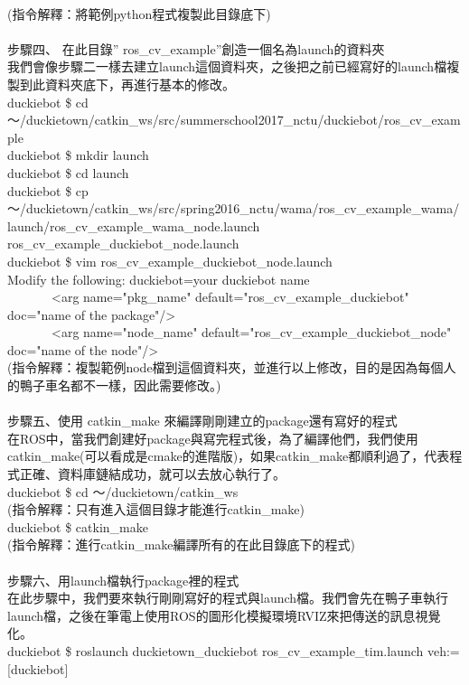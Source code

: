 \documentclass{article}
\begin{document}
\\(指令解釋：將範例python程式複製此目錄底下)
\\\\步驟四、 在此目錄” ros\_cv\_example”創造一個名為launch的資料夾
\\我們會像步驟二一樣去建立launch這個資料夾，之後把之前已經寫好的launch檔複製到此資料夾底下，再進行基本的修改。
\\duckiebot \$ cd ～/duckietown/catkin\_ws/src/summerschool2017\_nctu/duckiebot/ros\_cv\_example
\\duckiebot \$ mkdir launch
\\duckiebot \$ cd launch
\\duckiebot \$ cp ～/duckietown/catkin\_ws/src/spring2016\_nctu/wama/ros\_cv\_example\_wama/launch/ros\_cv\_example\_wama\_node.launch ros\_cv\_example\_duckiebot\_node.launch
\\duckiebot \$ vim ros\_cv\_example\_duckiebot\_node.launch
\\Modify the following: duckiebot=your duckiebot name
\\       <arg name="pkg\_name" default="ros\_cv\_example\_duckiebot" doc="name of the package"/>
\\       <arg name="node\_name" default="ros\_cv\_example\_duckiebot\_node" doc="name of the node"/>
\\(指令解釋：複製範例node檔到這個資料夾，並進行以上修改，目的是因為每個人的鴨子車名都不一樣，因此需要修改。)
\\\\步驟五、使用 catkin\_make 來編譯剛剛建立的package還有寫好的程式
\\在ROS中，當我們創建好package與寫完程式後，為了編譯他們，我們使用catkin\_make(可以看成是cmake的進階版)，如果catkin\_make都順利過了，代表程式正確、資料庫鏈結成功，就可以去放心執行了。
\\duckiebot \$ cd ～/duckietown/catkin\_ws
\\(指令解釋：只有進入這個目錄才能進行catkin\_make)
\\duckiebot \$ catkin\_make
\\(指令解釋：進行catkin\_make編譯所有的在此目錄底下的程式)
\\\\步驟六、用launch檔執行package裡的程式
\\在此步驟中，我們要來執行剛剛寫好的程式與launch檔。我們會先在鴨子車執行launch檔，之後在筆電上使用ROS的圖形化模擬環境RVIZ來把傳送的訊息視覺化。
\\duckiebot \$ roslaunch duckietown\_duckiebot ros\_cv\_example\_tim.launch veh:=[duckiebot]
\end{document}

